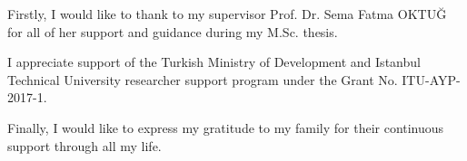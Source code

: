 Firstly, I would like to thank to my supervisor Prof. Dr. Sema Fatma OKTU\u{G} for all of
her support and guidance during my M.Sc. thesis.

I appreciate support of the Turkish Ministry of Development and Istanbul Technical University researcher support program under the Grant No. ITU-AYP-2017-1.

Finally, I would like to express my gratitude to my family for their continuous support
through all my life.
